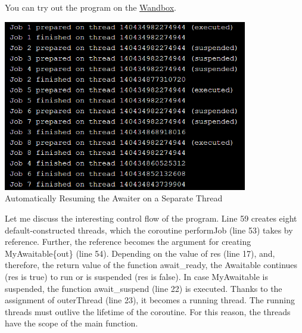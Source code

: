 You can try out the program on the \href{https://wandbox.org/permlink/skHgWKF0SYAwp8Dm}{Wandbox}.

\begin{center}
\includegraphics[width=0.8\textwidth]{content/3/chapter7/images/21.png}\\
Automatically Resuming the Awaiter on a Separate Thread
\end{center}

Let me discuss the interesting control flow of the program. Line 59 creates eight default-constructed threads, which the coroutine performJob (line 53) takes by reference. Further, the reference becomes the argument for creating MyAwaitable\{out\} (line 54). Depending on the value of res (line 17), and, therefore, the return value of the function await\_ready, the Awaitable continues (res is true) to run or is suspended (res is false). In case MyAwaitable is suspended, the function await\_suspend (line 22) is executed. Thanks to the assignment of outerThread (line 23), it becomes a running thread. The running threads must outlive the lifetime of the coroutine. For this reason, the threads have the scope of the main function.

